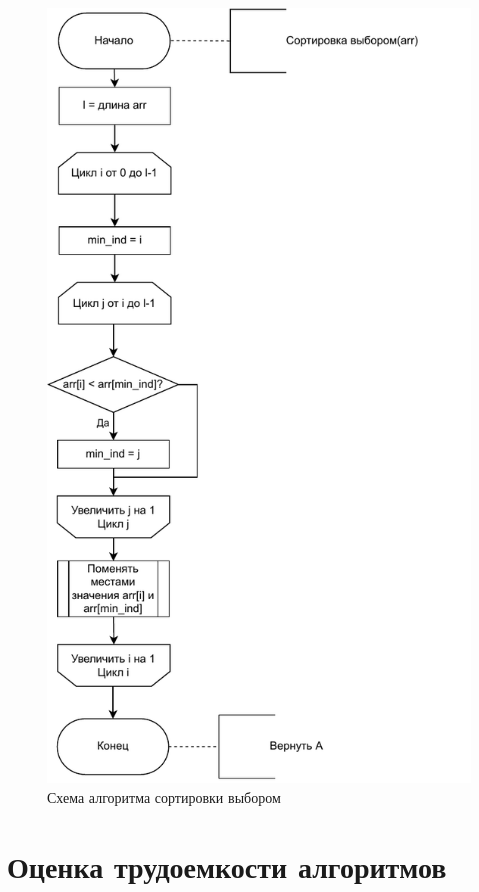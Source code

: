 \begin{figure}[H]
	\centering
	\includegraphics[scale=0.62]{assets/selectionsort.pdf}
	\caption{Схема алгоритма сортировки выбором}
	\label{pic:selectionsort}
\end{figure}

\newpage


\section{Оценка трудоемкости алгоритмов}

